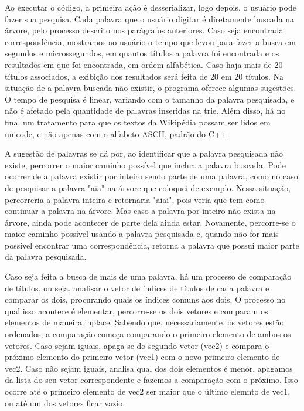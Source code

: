 \documentclass{article}
\begin{document}
Ao executar o código, a primeira ação é desserializar, logo depois, o usuário pode fazer sua pesquisa. Cada palavra que o usuário digitar é diretamente buscada na árvore, pelo processo descrito nos parágrafos anteriores. Caso seja encontrada correspondência, mostramos ao usuário o tempo que levou para fazer a busca em segundos e microssegundos, em quantos títulos a palavra foi encontrada e os resultados em que foi encontrada, em ordem alfabética. Caso haja mais de 20 títulos associados, a exibição dos resultados será feita de 20 em 20 títulos. Na situação de a palavra buscada não existir, o programa oferece algumas sugestões. O tempo de pesquisa é linear, variando com o tamanho da palavra pesquisada, e não é afetado pela quantidade de palavras inseridas na trie. 
Além disso, há no final um tratamento para que os textos da Wikipédia possam ser lidos em unicode, e não apenas com o alfabeto ASCII, padrão do C++.

A sugestão de palavras se dá por, ao identificar que a palavra pesquisada não existe, percorrer o maior caminho possível que inclua a palavra buscada. Pode ocorrer de a palavra existir por inteiro sendo parte de uma palavra, como no caso de pesquisar a palavra "aia" na árvore que coloquei de exemplo. Nessa situação, percorreria a palavra inteira e retornaria "aiai", pois veria que tem como continuar a palavra na árvore. Mas caso a palavra por inteiro não exista na árvore, ainda pode acontecer de parte dela ainda estar. Novamente, percorre-se o maior caminho possível usando a palavra pesquisada e, quando não for mais possível encontrar uma correspondência, retorna a palavra que possui maior parte da palavra pesquisada.


Caso seja feita a busca de mais de uma palavra, há um processo de comparação de títulos, ou seja, analisar o vetor de índices de títulos de cada palavra e comparar os dois, procurando quais os índices comuns aos dois. O processo no qual isso acontece é elementar, percorre-se  os dois vetores e comparam os elementos de maneira inplace. Sabendo que, necessariamente, os vetores estão ordenados, a comparação começa comparando o primeiro elemento de ambos os vetores. Caso sejam iguais, apaga-se do segundo vetor (vec2) e compara o próximo elemento do primeiro vetor (vec1) com o novo primeiro elemento de vec2. Caso não sejam iguais, analisa qual dos dois elementos é menor, apagamos da lista do seu vetor correspondente e fazemos a comparação com o próximo. Isso ocorre até o primeiro elemento de vec2 ser maior que o último elemnto de vec1, ou até um dos vetores ficar vazio.
\end{document}
